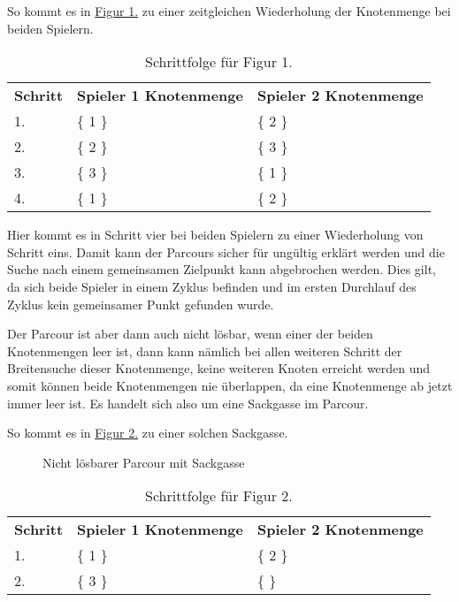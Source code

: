 \documentclass[a4paper,10pt,ngerman]{scrartcl}
\begin{document}
    So kommt es in \hyperref[fig:Figure1]{Figur 1.} zu einer zeitgleichen Wiederholung der Knotenmenge bei beiden Spielern.
    
    \begin{table}
    \centering
    \begin{tabular}{lll}
    \textbf{Schritt} & \textbf{Spieler 1 Knotenmenge} & \textbf{Spieler 2 Knotenmenge} \\
    1. & \{ 1 \} & \{ 2 \} \\
    2. & \{ 2 \} & \{ 3 \} \\
    3. & \{ 3 \} & \{ 1 \} \\
    4. & \{ 1 \} & \{ 2 \} \\
    \end{tabular}
    \caption{Schrittfolge für Figur 1.}
    \label{tab:Table1}
    \end{table}
    
    Hier kommt es in Schritt vier bei beiden Spielern zu einer Wiederholung von Schritt eins.
    Damit kann der Parcours sicher für ungültig erklärt werden
    und die Suche nach einem gemeinsamen Zielpunkt kann abgebrochen werden.
    Dies gilt, da sich beide Spieler in einem Zyklus befinden
    und im ersten Durchlauf des Zyklus kein gemeinsamer Punkt gefunden wurde.
    
    Der Parcour ist aber dann auch nicht lösbar, wenn einer der beiden Knotenmengen leer ist,
    dann kann nämlich bei allen weiteren Schritt der Breitensuche dieser Knotenmenge,
    keine weiteren Knoten erreicht werden und somit können beide Knotenmengen nie überlappen,
    da eine Knotenmenge ab jetzt immer leer ist. Es handelt sich also um eine Sackgasse im Parcour.
    
	So kommt es in \hyperref[fig:Figure2]{Figur 2.} zu einer solchen Sackgasse.
    
	\begin{figure}[htb]
    \centering
    \NameOfAdigraph{}
    \caption{Nicht lösbarer Parcour mit Sackgasse}
    \label{fig:Figure2}
    \end{figure}
    
    \begin{table}[htb]
    \centering
    \begin{tabular}{lll}
    \textbf{Schritt} & \textbf{Spieler 1 Knotenmenge} & \textbf{Spieler 2 Knotenmenge} \\
    1. & \{ 1 \} & \{ 2 \} \\
    2. & \{ 3 \} & \{  \} \\
    \end{tabular}
    \caption{Schrittfolge für Figur 2.}
    \label{tab:Table2}
    \end{table}
    
\end{document}
